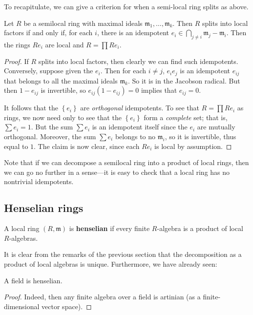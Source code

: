 To recapitulate, we can give a criterion for when a semi-local ring splits as
above.
\begin{proposition} \label{whatissplitting}
Let $R$ be a semilocal ring with maximal ideals $\mathfrak{m}_1, \dots,
\mathfrak{m}_k$. Then $R$ splits into local factors if and only if, for each
$i$, there is an idempotent $e_i \in \bigcap_{j \neq i} \mathfrak{m}_j -
\mathfrak{m}_i$. Then the rings $Re_i$ are local and $R = \prod Re_i$.
\end{proposition} 
\begin{proof} 
If $R$ splits into local factors, then clearly we can find such idempotents.
Conversely, suppose given the $e_i$.
Then for each $i \neq j$, $e_i e_j$ is an idempotent  $e_{ij}$ that belongs to all the
maximal ideals $\mathfrak{m}_k$. So it is in the Jacobson radical. But then $1 -
e_{ij}$ is invertible, so $e_{ij}(1-e_{ij})=0$ implies that $e_{ij} = 0$. 

It follows that the $\left\{e_i\right\}$ are \emph{orthogonal} idempotents. To
see that $R = \prod Re_i$ as rings, we now need only to see that the
$\left\{e_i\right\}$ form a \emph{complete} set; that is, $\sum e_i = 1$. But
the sum $\sum e_i$ is an idempotent itself since the $e_i$ are mutually
orthogonal. Moreover, the sum $\sum e_i$ belongs to no $\mathfrak{m}_i$, so it
is invertible, thus equal to $1$. The claim is now clear, since each $Re_i$ is
local by assumption.
\end{proof} 

Note that if we can decompose a semilocal ring into a product of local rings,
then we can go no further in a sense---it is easy to check that a local ring has
no nontrivial idempotents. 

\subsection{Henselian rings}

\begin{definition}
A local ring $(R, \mathfrak{m})$ is \textbf{henselian} if every finite
$R$-algebra is a product of local $R$-algebras.
\end{definition}


It is clear from the remarks of the previous section that the 
decomposition as a product of local algebras is unique.
Furthermore, we have already seen:

\begin{proposition} 
A field is henselian. 
\end{proposition}
\begin{proof} 
Indeed, then any finite algebra over a field is artinian (as a
finite-dimensional vector space).
\end{proof} 

